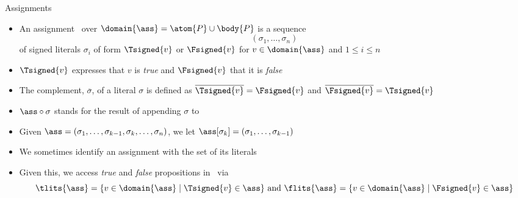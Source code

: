 \begin{frame}{Assignments}
  \begin{itemize}
  \item<1-> An \alert{assignment} \ass\ over $\domain{\ass}=\atom{P}\cup\body{P}$
    is a sequence
    \[
    (\sigma_1,\ldots,\sigma_n)
    \]
    of \alert{signed literals}
    $\sigma_i$ of form \alert{$\Tsigned{v}$} or \alert{$\Fsigned{v}$} for
    $v\in\domain{\ass}$ and $1 \leq i \leq n$
  \item<1,7> $\Tsigned{v}$ expresses that $v$ is \emph{true} and $\Fsigned{v}$ that it is \emph{false}
  \item<2,7> The complement, $\overline{\sigma}$, of a literal $\sigma$ is defined as
    $\overline{\Tsigned{v}} = \Fsigned{v}$ and $\overline{\Fsigned{v}} = \Tsigned{v}$
  \item<3,7> $\ass\circ\sigma$ stands for the result of appending $\sigma$ to \ass
  \item<4,7> Given $\ass=(\sigma_1,\ldots,\sigma_{k-1},\sigma_k,\dots,\sigma_n)$,
        we let $\ass[\sigma_k]=(\sigma_1,\ldots,\sigma_{k-1})$
  \item<5,6,7> We sometimes identify an assignment with the set of its literals
  \item<6,7>
    Given this,
    we access \emph{true} and \emph{false} propositions in \ass\ via
    \[
    \tlits{\ass}
    =
    \{v \in \domain{\ass} \mid \Tsigned{v} \in\ass\}
    \text{ and }
    \flits{\ass}
    =
    \{v \in \domain{\ass} \mid \Fsigned{v} \in\ass\}
    \]
  \end{itemize}
\end{frame}
